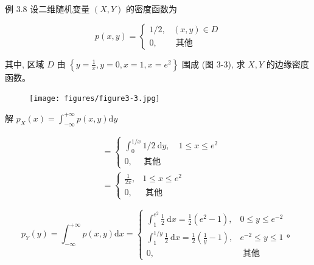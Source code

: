 \documentclass{beamer}
\begin{document}
	\begin{frame}
		例 3.8 设二维随机变量 $(X, Y)$ 的密度函数为
		
		$$
		p(x, y)=\left\{\begin{array}{cc}
			1 / 2, & (x, y) \in D \\
			0, & \text { 其他 }
		\end{array}\right.
		$$
		
		其中, 区域 $D$ 由 $\left\{y=\frac{1}{x}, y=0, x=1, x=e^{2}\right\}$ 围成 (图 3-3), 求 $X, Y$ 的边缘密度函数。
		
		\begin{figure}
			\centering
			\texttt{[image: figures/figure3-3.jpg]}
		\end{figure}
	\end{frame}
	
	\begin{frame}
		解 $p_{X}(x)=\int_{-\infty}^{+\infty} p(x, y) \mathrm{d} y$
		
		$$
		\begin{aligned}
			& =\left\{\begin{array}{c}
				\int_{0}^{1 / x} 1 / 2 \mathrm{~d} y, \quad 1 \leqslant x \leqslant e^{2} \\
				0, \quad \text { 其他 }
			\end{array}\right. \\
			& =\left\{\begin{array}{cc}
				\frac{1}{2 x}, & 1 \leqslant x \leqslant e^{2} \\
				0, & \text { 其他 }
			\end{array}\right.
		\end{aligned}
		$$
		
		$$
		p_{Y}(y)=\int_{-\infty}^{+\infty} p(x, y) \mathrm{d} x=\left\{\begin{array}{cc}
			\int_{1}^{e^{2}} \frac{1}{2} \mathrm{~d} x=\frac{1}{2}\left(e^{2}-1\right), & 0 \leqslant y \leqslant e^{-2} \\
			\int_{1}^{1 / y} \frac{1}{2} \mathrm{~d} x=\frac{1}{2}\left(\frac{1}{y}-1\right), & e^{-2} \leqslant y \leqslant 1 \\
			0, & \text { 其他 }
		\end{array} 。\right.
		$$
	\end{frame}
	
\end{document}
